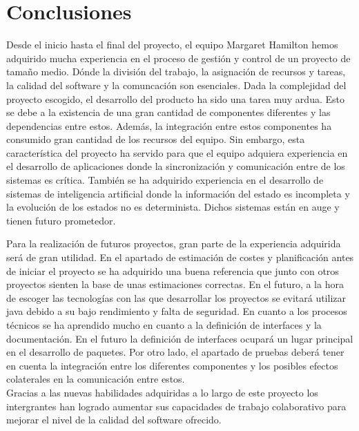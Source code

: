 \section{Conclusiones}
\label{conclusiones}

Desde el inicio hasta el final del proyecto, el equipo Margaret Hamilton hemos adquirido mucha experiencia en el proceso de gestión y control de un proyecto de tamaño medio. Dónde la división del trabajo, la asignación de recursos y tareas, la calidad del software y la comuncación son esenciales. Dada la complejidad del proyecto escogido, el desarrollo del producto ha sido una tarea muy ardua. Esto se debe a la existencia de una gran cantidad de componentes diferentes y las dependencias entre estos. Además, la integración entre estos componentes ha consumido gran cantidad de los recursos del equipo. Sin embargo, esta característica del proyecto ha servido para que el equipo adquiera experiencia en el desarrollo de aplicaciones donde la sincronización y comunicación entre de los sistemas es crítica. También se ha adquirido experiencia en el desarrollo de sistemas de inteligencia artificial donde la información del estado es incompleta y la evolución de los estados no es determinista. Dichos sistemas están en auge y tienen futuro prometedor.

Para la realización de futuros proyectos, gran parte de la experiencia adquirida será de gran utilidad. En el apartado de estimación de costes y planificación antes de iniciar el proyecto se ha adquirido una buena referencia que junto con otros proyectos sienten la base de unas estimaciones correctas. En el futuro, a la hora de escoger las tecnologías con las que desarrollar los proyectos se evitará utilizar java debido a su bajo rendimiento y falta de seguridad. En cuanto a los procesos técnicos se ha aprendido mucho en cuanto a la definición de interfaces y la documentación. En el futuro la definición de interfaces ocupará un lugar principal en el desarrollo de paquetes. Por otro lado, el apartado de pruebas deberá tener en cuenta la integración entre los diferentes componentes y los posibles efectos colaterales en la comunicación entre estos.
\\
Gracias a las nuevas habilidades adquiridas a lo largo de este proyecto los intergrantes han logrado aumentar sus capacidades de trabajo colaborativo para mejorar el nivel de la calidad del software ofrecido.
